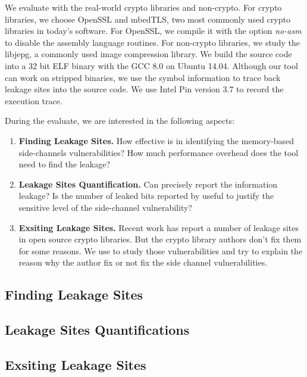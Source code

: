 We evaluate \tool{} with the real-world crypto libraries and non-crypto. 
For crypto libraries, we choose OpenSSL and mbedTLS, two most commonly used
crypto libraries in today's software. For OpenSSL, we compile it with the option \textit{no-asm} 
to disable the assembly language routines. For non-crypto libraries, 
we study the libjepg, a commonly used image compression library. 
We build the source code into a 32 bit 
ELF binary with the GCC 8.0 on Ubuntu 14.04. Although our tool can
work on stripped binaries, we use the symbol information to trace
back leakage sites into the source code. We use Intel Pin version 3.7 
to record the execution trace.


During the evaluate, we are interested in the following aspects:
\begin{enumerate}
    \item \textbf{Finding Leakage Sites.} How effective is \tool{} in 
    identifying the memory-based side-channels vulnerabilities?
    How much performance overhead does the tool need to find the 
    leakage?
    \item \textbf{Leakage Sites Quantification.} Can \tool{} precisely
    report the information leakage? Is the number of leaked bits reported 
    by \tool{} useful to justify the sensitive level of the side-channel
    vulnerability?
    \item \textbf{Exsiting Leakage Sites.} Recent work has report a number
    of leakage sites in open source crypto libraries. But the crypto
    library authors don't fix them for some reasons. We use \tool{} to
    study those vulnerabilities and try to explain the reason why the 
    author fix or not fix the side channel vulnerabilities.
\end{enumerate}


\subsection{Finding Leakage Sites}
\subsection{Leakage Sites Quantifications}
\subsection{Exsiting Leakage Sites}
